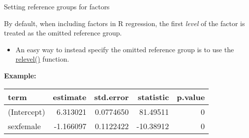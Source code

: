 \documentclass[ignorenonframetext,]{beamer}
\newenvironment{Shaded}{\begin{snugshade}}{\end{snugshade}}
\newcommand{\KeywordTok}[1]{\textcolor[rgb]{0.26,0.66,0.93}{\textbf{#1}}}
\newcommand{\DataTypeTok}[1]{\textcolor[rgb]{0.74,0.68,0.62}{\underline{#1}}}
\newcommand{\StringTok}[1]{\textcolor[rgb]{0.02,0.61,0.04}{#1}}
\newcommand{\OperatorTok}[1]{\textcolor[rgb]{0.74,0.68,0.62}{#1}}
\newcommand{\NormalTok}[1]{\textcolor[rgb]{0.74,0.68,0.62}{#1}}
\providecommand{\tightlist}{%
  \setlength{\itemsep}{0pt}\setlength{\parskip}{0pt}}
\begin{document}
\begin{frame}[fragile]{Setting reference groups for factors}

By default, when including factors in R regression, the first
\emph{level} of the factor is treated as the omitted reference group.

\begin{itemize}
\tightlist
\item
  An easy way to instead specify the omitted reference group is to use
  the
  \href{https://www.rdocumentation.org/packages/stats/versions/3.4.3/topics/relevel}{relevel()}
  function.
\end{itemize}

\textbf{Example:}

\begin{Shaded}
\end{Shaded}

\begin{longtable}[]{@{}lrrrr@{}}
\toprule
term & estimate & std.error & statistic & p.value\tabularnewline
\midrule
\endhead
(Intercept) & 6.313021 & 0.0774650 & 81.49511 & 0\tabularnewline
sexfemale & -1.166097 & 0.1122422 & -10.38912 & 0\tabularnewline
\bottomrule
\end{longtable}

\end{frame}
\end{document}
